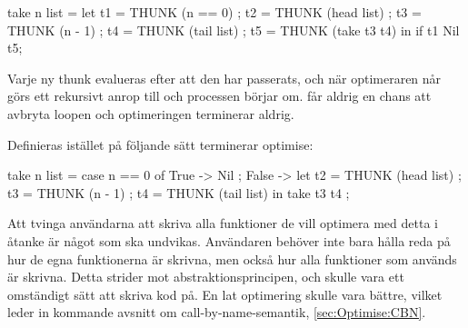 \documentclass[../Optimise]{subfiles}
\begin{document}
\begin{codeEx}
take n list = let 
    { t1 = THUNK (n == 0)
    ; t2 = THUNK (head list)
    ; t3 = THUNK (n - 1)
    ; t4 = THUNK (tail list)
    ; t5 = THUNK (take t3 t4)
    } in  if t1 Nil t5;
\end{codeEx}

Varje ny thunk evalueras efter att den har passerats, och när optimeraren når 
 görs ett rekursivt anrop till  och processen börjar om.
 får aldrig en chans att avbryta loopen och optimeringen terminerar aldrig.

Definieras  istället på följande sätt terminerar optimise:

\begin{codeEx}
take n list = case n == 0 of
    { True -> Nil
    ; False -> let 
        { t2 = THUNK (head list)
        ; t3 = THUNK (n - 1)
        ; t4 = THUNK (tail list)
        } in  take t3 t4
    };
\end{codeEx}


Att tvinga användarna att skriva alla funktioner
de vill optimera med detta i åtanke är något som ska undvikas.
 Användaren behöver inte bara hålla reda på 
hur de egna funktionerna är skrivna, men också hur alla funktioner som används är skrivna. 
Detta strider mot abstraktionsprincipen, och skulle vara ett omständigt sätt
 att skriva kod på. 
En lat optimering skulle vara bättre, vilket leder in kommande avsnitt om
call-by-name-semantik, \ref{sec:Optimise:CBN}.
\end{document}
